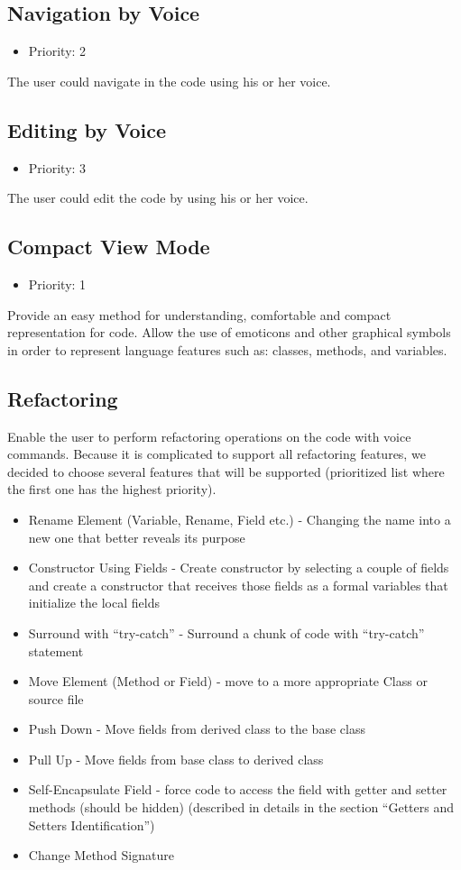 \subsection{Navigation by Voice} \label{ssec:num1}
\begin{itemize}
	\item Priority: 2
\end{itemize}
The user could navigate in the code using his or her voice.
\subsection{Editing by Voice}
\begin{itemize}
	\item Priority: 3
\end{itemize}
The user could edit the code by using his or her voice.
\subsection{Compact View Mode}
\begin{itemize}
	\item Priority: 1
\end{itemize}
Provide an easy method for understanding, comfortable and compact representation for code. Allow the use of emoticons and other graphical symbols in order to represent language features such as: classes, methods, and variables.
\subsection{Refactoring}
Enable the user to perform refactoring operations on the code with voice commands. Because it is complicated to support all refactoring features, we decided to choose several features that will be supported (prioritized list where the first one has the highest priority).
\begin{itemize}
	\item Rename Element (Variable, Rename, Field etc.) - Changing the name into a new one that better reveals its purpose
	\item Constructor Using Fields - Create constructor by selecting a couple of fields and create a constructor that receives those fields as a formal variables that initialize the local fields
	\item Surround with “try-catch” - Surround a chunk of code with “try-catch” statement
	\item Move Element (Method or Field) - move to a more appropriate Class or source file
	\item Push Down - Move fields from derived class to the base class
	\item Pull Up - Move fields from base class to derived class
	\item Self-Encapsulate Field - force code to access the field with getter and setter methods (should be hidden) (described in details in the section “Getters and Setters Identification”)
	\item Change Method Signature
\end{itemize}
